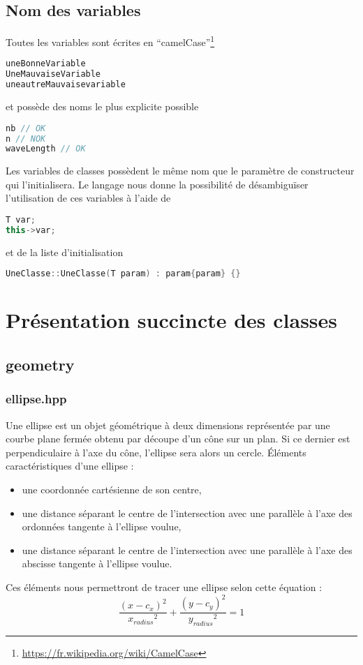 \documentclass[a4paper,11pt]{report}
\begin{document}
\section{Nom des variables}
Toutes les variables sont écrites en
``camelCase''\footnote{\url{https://fr.wikipedia.org/wiki/CamelCase}}
\begin{lstlisting}[frame=single,language=C++]
uneBonneVariable
UneMauvaiseVariable
uneautreMauvaisevariable
\end{lstlisting}
et possède des noms le plus explicite possible
\begin{lstlisting}[frame=single,language=C++]
nb // OK
n // NOK
waveLength // OK
\end{lstlisting}
Les variables de classes possèdent le même nom que le paramètre de constructeur
qui l'initialisera. Le langage nous donne la possibilité de désambiguïser
l'utilisation de ces variables à l'aide de 
\begin{lstlisting}[frame=single,language=C++]
T var;
this->var;
\end{lstlisting}
et de la liste d'initialisation
\begin{lstlisting}[frame=single,language=C++]
UneClasse::UneClasse(T param) : param{param} {}
\end{lstlisting}
\chapter[Les classes]{Présentation succincte des classes}
\section[Les objets géométriques]{geometry}

\subsection[Ellipse]{ellipse.hpp}
\begin{center}
\end{center}
Une ellipse est un objet géométrique à deux dimensions représentée par
une courbe plane fermée obtenu par découpe d'un cône sur un plan. Si ce dernier
est perpendiculaire à l'axe du cône, l'ellipse sera alors un cercle.
Éléments caractéristiques d'une ellipse :
\begin{itemize}
	\item une coordonnée cartésienne de son centre,
	\item une distance séparant le centre de l'intersection avec une parallèle à
		l'axe des ordonnées tangente à l'ellipse voulue,
	\item une distance séparant le centre de l'intersection avec une parallèle à
		l'axe des abscisse tangente à l'ellipse voulue.
\end{itemize}
Ces éléments nous permettront de tracer une ellipse selon cette équation :
$$\frac{(x - c_x)^2}{{x_{radius}}^2} + \frac{(y - c_y)^2}{{y_{radius}}^2} = 1$$
\end{document}
